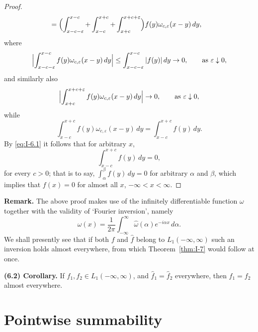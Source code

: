 \begin{proof}
\begin{equation*}
\begin{aligned}
&= \Bigl(\int_{x-c-\varepsilon}^{x-c}+\int_{x-c}^{x+c}+\int_{x+c}^{x+c+\varepsilon}\Bigr)f(y)\omega_{c,\varepsilon}(x-y)\,dy,
\end{aligned}
\end{equation*}
where
\begin{equation*}
\Bigl|\int_{x-c-\varepsilon}^{x-c}f(y)\omega_{c,\varepsilon}(x-y)\,dy\Bigr|
\le\int_{x-c-\varepsilon}^{x-c}|f(y)|\,dy\to 0,
\qquad\text{as }\varepsilon\downarrow 0,
\end{equation*}
and similarly also
\begin{equation*}
\Bigl|\int_{x+c}^{x+c+\varepsilon}f(y)\omega_{c,\varepsilon}(x-y)\,dy\Bigr|\to 0,
\qquad\text{as }\varepsilon\downarrow 0,
\end{equation*}
while
\begin{equation*}
\int_{x-c}^{x+c}f(y)\omega_{c,\varepsilon}(x-y)\,dy
=\int_{x-c}^{x+c}f(y)\,dy.
\end{equation*}
By \eqref{eq:I-6.1} it follows that for arbitrary $x$,
\begin{equation*}
\int_{x-c}^{x+c}f(y)\,dy=0,
\end{equation*}
for every $c>0$; that is to say, $\int_\alpha^\beta f(y)\,dy=0$ for arbitrary $\alpha$ and $\beta$, which implies that $f(x)=0$ for almost all $x$, $-\infty<x<\infty$.
\end{proof}

\noindent\textbf{Remark.}
The above proof makes use of the infinitely differentiable function $\omega$ together with the validity of `Fourier inversion', namely
\begin{equation*}
\omega(x)=\frac{1}{2\pi}\int_{-\infty}^{\infty}\hat\omega(\alpha)e^{-i\alpha x}\,d\alpha.
\end{equation*}
We shall presently see that if both $f$ and $\hat f$ belong to $L_1(-\infty,\infty)$ such an inversion holds almost everywhere, from which Theorem~\ref{thm:I-7} would follow at once.

\noindent\textbf{(6.2) Corollary.}
If $f_1,f_2\in L_1(-\infty,\infty)$, and $\hat f_1=\hat f_2$ everywhere, then $f_1=f_2$ almost everywhere.

\section{Pointwise summability}
\label{sec:I-7}

